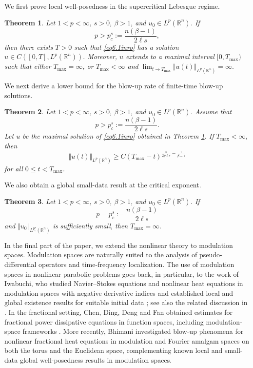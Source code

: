 \documentclass[12pt, reqno]{amsart}
\newtheorem{theorem}{Theorem}[section]
\theoremstyle{definition}
\theoremstyle{remark}
\numberwithin{equation}{section}
\begin{document}
We first prove local well-posedness in the supercritical Lebesgue regime.

\begin{theorem}
\label{them6.1intro}
Let $1<p<\infty$, $s>0$, $\beta>1$, and $u_0\in L^p(\mathbb{R}^n)$. If
\[
p>p_c^s:=\frac{n(\beta-1)}{2\ell s},
\]
then there exists $T>0$ such that \eqref{eq6.1inro} has a solution $u\in C([0,T],L^p(\mathbb{R}^n)).$
Moreover, $u$ extends to a maximal interval $[0,T_{\max})$ such that either $T_{\max}=\infty$, or $T_{\max}<\infty$ and $\lim_{t\rightarrow T_{\max}}
\Vert u(t)\Vert_{L^p(\mathbb{R}^n)}
= \infty.$
\end{theorem}

We next derive a lower bound for the blow-up rate of finite-time blow-up solutions.

\begin{theorem}

Let $1<p<\infty$, $s>0$, $\beta>1$, and $u_0\in L^p(\mathbb R^n)$. Assume that
\[
    p>p_c^s:=\frac{n(\beta-1)}{2\ell s}.
\]
Let $u$ be the maximal solution of \eqref{eq6.1inro} obtained in Theorem \ref{them6.1intro}. If $T_{\max}<\infty$, then
\[
    \Vert u(t)\Vert_{L^p(\mathbb R^n)}
    \geq
    C
    (T_{\max}-t)^{
    \frac{n}{2p\ell s}  -
    \frac{1}{\beta-1}
    }
\]
for all $0\leq t<T_{\max}$.
\end{theorem}


We also obtain a global small-data result at the critical exponent.

\begin{theorem}
Let $1<p<\infty$, $s>0$, $\beta>1$, and $u_0\in L^p(\mathbb{R}^n)$. If
\[
p=p_c^s:=\frac{n(\beta-1)}{2\ell s}
\]
and $\Vert u_0\Vert_{L^{p_c^s}(\mathbb{R}^n)}$ is sufficiently small, then $T_{\max}=\infty.$
\end{theorem}

In the final part of the paper, we extend the nonlinear theory to modulation spaces. Modulation spaces are naturally suited to the analysis of pseudo-differential operators and time-frequency localization.  The use of modulation spaces in nonlinear parabolic problems goes back, in particular, to the work of Iwabuchi, who studied Navier--Stokes equations and nonlinear heat equations in modulation spaces with negative derivative indices and established local and global existence results for suitable initial data \cite{Iwabuchi}; see also the related discussion in \cite{RSW12}. In the fractional setting, Chen, Ding, Deng and Fan obtained estimates for fractional power dissipative equations in function spaces, including modulation-space frameworks \cite{CDDF12}. More recently, Bhimani \cite{BhimaniBlowup} investigated blow-up phenomena for nonlinear fractional heat equations
in modulation and Fourier amalgam spaces on both the torus and the Euclidean space, complementing known local and small-data global well-posedness results in modulation spaces. 
\end{document}
